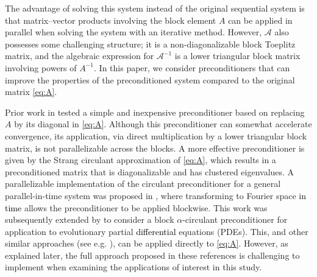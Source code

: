 \documentclass{article}
\newcommand{\aw}{\textcolor{black}}%
\newcommand{\jt}{\textcolor{black}}%
\theoremstyle{definition}
\begin{document}
	
	The advantage of solving this system instead of the original sequential system is that matrix--vector products involving the block element $A$ can be applied in parallel when solving the system with an iterative method. However, $\mathcal{A}$ also possesses some challenging structure; it 
	is a {non-diagonalizable} block Toeplitz matrix, and the algebraic expression for $\mathcal{A}^{-1}$ is a lower triangular block matrix involving powers of $A^{-1}$. In this paper, we consider preconditioners that can improve the properties of the preconditioned system compared to the original matrix \eqref{eq:A}.
	
	Prior work in \cite{weaver2018time} tested a simple and inexpensive preconditioner based on replacing $A$ by its diagonal in \eqref{eq:A}. Although this preconditioner can somewhat accelerate convergence, its application, via direct multiplication by a lower triangular block matrix, is not parallelizable across the blocks. 
	A more effective preconditioner is given by the Strang circulant approximation of \eqref{eq:A}, which results in a preconditioned matrix that is diagonalizable and has clustered eigenvalues.
	A parallelizable implementation of the circulant preconditioner for a general parallel-in-time system was proposed in \cite{mcdonald2018preconditioning}, where transforming to Fourier space \aw{in time} allows the preconditioner to be applied blockwise. This work was subsequently extended by \cite{LinNgalphacirculant2021} to consider a block $\alpha$-circulant preconditioner for application to evolutionary partial \jt{differential} equations (PDEs). This, and other similar approaches (see e.g. \cite{bertaccini2003block,hon_sine_2024,li_preconditioned_2024,liu2020fast}), can be applied directly to \eqref{eq:A}. However, as explained later, the full approach proposed in these references is challenging to implement when examining the applications of interest in this study.
	
\end{document}
